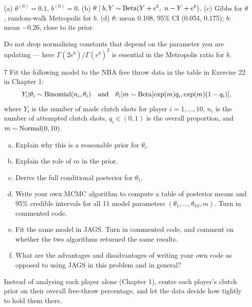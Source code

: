 \documentclass[11pt]{article}
\begin{document}
\begin{answer}
(a) $\theta^{(0)}=0.1$, $b^{(0)}=0$. (b) $\theta\mid b,Y\sim\dist{Beta}(Y+e^b,\ n-Y+e^b)$. (c) Gibbs for $\theta$, random-walk Metropolis for $b$.
(d) $\theta$: mean 0.108, 95\% CI (0.054, 0.175); $b$: mean $-0.26$, close to its prior.
\end{answer}

\begin{takeaway}
Do not drop normalising constants that depend on the parameter you are updating --- here $\Gamma(2e^b)/\Gamma(e^b)^2$ is essential in the Metropolis ratio for $b$.
\end{takeaway}


\begin{problem}{7}
Fit the following model to the NBA free throw data in the table in Exercise 22 in Chapter 1:
\[
Y_i|\theta_i\sim\mathrm{Binomial}(n_i,\theta_i)\quad\text{and}\quad\theta_i|m\sim\mathrm{Beta}[\exp(m)q_i,\exp(m)(1-q_i)],
\]
where $Y_i$ is the number of made clutch shots for player $i=1,\dots,10$, $n_i$ is the number of attempted clutch shots, $q_i\in(0,1)$ is the overall proportion, and $m\sim\mathrm{Normal}(0,10)$.
\begin{enumerate}[(a)]
\item Explain why this is a reasonable prior for $\theta_i$.
\item Explain the role of $m$ in the prior.
\item Derive the full conditional posterior for $\theta_1$.
\item Write your own MCMC algorithm to compute a table of posterior means and 95\% credible intervals for all 11 model parameters $(\theta_1,\dots,\theta_{10},m)$. Turn in commented code.
\item Fit the same model in JAGS. Turn in commented code, and comment on whether the two algorithms returned the same results.
\item What are the advantages and disadvantages of writing your own code as opposed to using JAGS in this problem and in general?
\end{enumerate}
\end{problem}

\begin{restate}
Instead of analysing each player alone (Chapter 1), centre each player's clutch prior on their overall free-throw percentage, and let the data decide how tightly to hold them there.
\end{restate}
\end{document}
